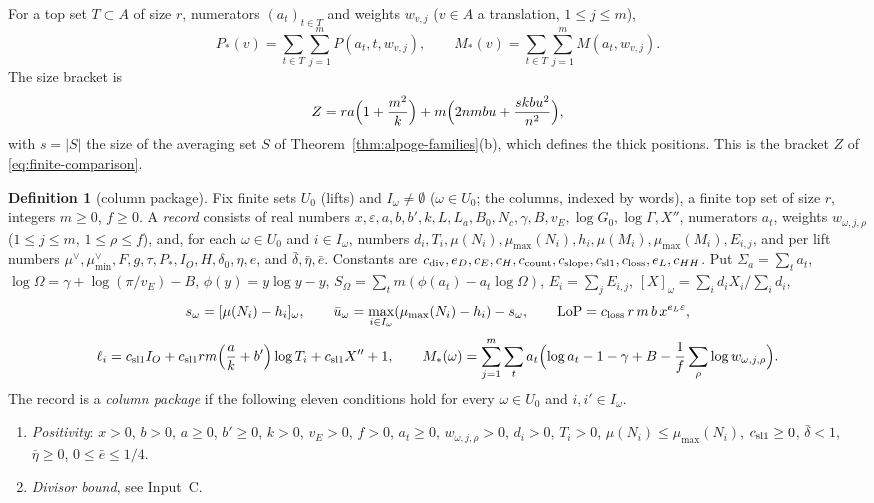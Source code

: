 \documentclass[10pt]{amsart}
\theoremstyle{definition}
\newtheorem{definition}[theorem]{Definition}
\theoremstyle{remark}
\begin{document}
For a top set $T\subset A$ of size $r$, numerators $(a_t)_{t\in T}$ and
weights $w_{v,j}$ ($v\in A$ a translation, $1\le j\le m$),
\[
 P_*(v)=\sum_{t\in T}\sum_{j=1}^m P(a_t,t,w_{v,j}),\qquad
 M_*(v)=\sum_{t\in T}\sum_{j=1}^m M(a_t,w_{v,j}).
\]
The size bracket is
\begin{equation}\label{eq:assembly-Z}
 Z=ra\Bigl(1+\frac{m^2}k\Bigr)+m\Bigl(2nmbu+\frac{skbu^2}{n^2}\Bigr),
\end{equation}
with $s=|S|$ the size of the averaging set $S$ of
Theorem~\ref{thm:alpoge-families}(b), which defines the thick positions.
This is the bracket $Z$ of \eqref{eq:finite-comparison}.



\begin{definition}[column package]\label{def:package}
Fix finite sets $U_0$ (lifts) and $I_\omega\neq\emptyset$ ($\omega\in U_0$;
the columns, indexed by words), a finite top set of size $r$, integers
$m\ge0$, $f\ge0$. A \emph{record} consists of real numbers
$x,\varepsilon,a,b,b',k,L,L_a,B_0,N_c,\gamma,B,v_E,\log G_0,\log\Gamma,X''$,
numerators $a_t$, weights $w_{\omega,j,\rho}$ ($1\le j\le m$, $1\le\rho\le f$),
and, for each $\omega\in U_0$ and $i\in I_\omega$, numbers
$d_i,T_i,\mu(N_i),\mu_{\max}(N_i),h_i,\mu(M_i),\mu_{\max}(M_i),E_{i,j}$,
and per lift numbers
$\mu^\vee,\mu^\vee_{\min},F,g,\tau,P_*,I_O,H,\delta_0,\eta,e$, and
$\bar\delta,\bar\eta,\bar e$.
Constants are $c_{\rm div},e_D,c_E,c_H,c_{\rm count},c_{\rm slope},c_{\rm sl1},c_{\rm loss},e_L,c_{HH}$. Put $\Sigma_a=\sum_ta_t$,
$\log\Omega=\gamma+\log(\pi/v_E)-B$, $\phi(y)=y\log y-y$,
$S_\Omega=\sum_tm(\phi(a_t)-a_t\log\Omega)$, $E_i=\sum_jE_{i,j}$,
$[X]_\omega=\sum_id_iX_i/\sum_id_i$,
\[
 s_\omega=[\mu(N_i)-h_i]_\omega,\qquad
 \bar u_\omega=\max_{i\in I_\omega}(\mu_{\max}(N_i)-h_i)-s_\omega,\qquad
 \mathrm{LoP}=c_{\rm loss}\,r\,m\,b\,x^{e_L\varepsilon},
\]
\[
 \ell_i=c_{\rm sl1}I_O+c_{\rm sl1}rm\Bigl(\frac ak+b'\Bigr)\log T_i+c_{\rm sl1}X''+1,
 \qquad
 M_*(\omega)=\sum_{j=1}^m\sum_t a_t\Bigl(\log a_t-1-\gamma+B-\frac1f\sum_\rho\log w_{\omega,j,\rho}\Bigr).
\]
The record is a \emph{column package} if the following
eleven conditions hold for every $\omega\in U_0$ and $i,i'\in I_\omega$.
\begin{enumerate}
\item[(P0)] \emph{Positivity}: $x>0$, $b>0$,
$a\ge0$, $b'\ge0$, $k>0$, $v_E>0$, $f>0$, $a_t\ge0$, $w_{\omega,j,\rho}>0$,
$d_i>0$, $T_i>0$, $\mu(N_i)\le\mu_{\max}(N_i)$, $c_{\rm sl1}\ge0$,
$\bar\delta<1$, $\bar\eta\ge0$, $0\le\bar e\le1/4$.
\item[(P1)] \emph{Divisor bound}, see Input~C.

\end{enumerate}
\end{definition}
\end{document}
